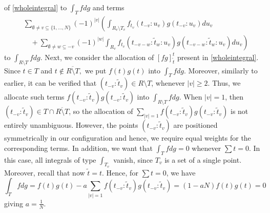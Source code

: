 \documentclass[english, a4paper, 12pt,reqno]{amsart}
\begin{document}
of \eqref{wholeintegral} to $\int_T f dg$ and terms 
\begin{equation*}
\begin{split}
& \sum_{\emptyset\neq v \subseteq \{1,\dots,N\}} (-1)^{|v|}\left(\int_{R_v\setminus T_v}  f_{t_v}(t_{-v}:u_v) g(t_{-v}:u_v)du_v \right.\\
&\quad+ \left. \sum_{\emptyset \neq w \subseteq -v} (-1)^{|w|} \int_{R_v}  f_{t_v}(t_{-v-w}: \tilde{t}_w:u_v) g(t_{-v-w}: \tilde{t}_w:u_v) du_v \right)
\end{split}
\end{equation*}
to $\int_{R\setminus T} f dg.$ Next, we consider the allocation of $[fg]_{\tilde{t}}^t$ present in \eqref{wholeintegral}. Since $t\in T$ and $t\notin \overline{R\setminus T},$ we put $f(t)g(t)$ into $\int_T f dg$. Moreover, similarly to earlier, it can be verified that $(t_{-v}: \tilde{t}_v) \in R\setminus T$, whenever $|v| \geq 2.$ Thus, we allocate such terms $f(t_{-v}: \tilde{t}_{v})g(t_{-v}: \tilde{t}_{v})$ into $\int_{R\setminus T} fdg.$ When $|v| =1$, then $(t_{-v}: \tilde{t}_v) \in T \cap \overline{R\setminus T}$, so the allocation of $\sum_{|v|=1} f(t_{-v}:\tilde{t}_v)g(t_{-v}:\tilde{t}_v)$ is not entirely unambiguous. However, the points $(t_{-v}: \tilde{t}_v)$ are positioned symmetrically in our configuration and hence, we require equal weights for the corresponding terms. In addition, we want that $\int_T f dg =0$ whenever $\sum t = 0$. In this case, all integrals of type $\int_{T_v}$ vanish, since $T_v$ is a set of a single point. Moreover, recall that now $\tilde{t} = t$. Hence, for $\sum t =0$, we have
$$\int_T f dg = f(t)g(t) - a\sum_{|v|=1} f(t_{-v}:\tilde{t}_v)g(t_{-v}:\tilde{t}_v) = (1-aN) f(t)g(t) = 0$$
giving $a= \frac{1}{N}.$
\end{document}
